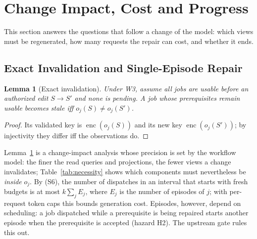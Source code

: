 \documentclass[pdflatex,sn-mathphys-num]{sn-jnl}
\theoremstyle{thmstyleone}%
\newtheorem{lemma}[theorem]{Lemma}%
\theoremstyle{thmstyletwo}%
\theoremstyle{thmstylethree}%
\newcommand{\enc}{\operatorname{enc}}
\begin{document}
\section{Change Impact, Cost and Progress}\label{sec:progress}
This section answers the questions that follow a change of the model: which views must be regenerated, how many requests the repair can cost, and whether it ends.

\subsection{Exact Invalidation and Single-Episode Repair}
\begin{lemma}[Exact invalidation]\label{lem:local}
Under W3, assume all jobs are usable before an authorized edit $S\to S'$ and none is pending. A job whose prerequisites remain usable becomes stale iff $o_j(S)\ne o_j(S')$.
\end{lemma}
\begin{proof}
Its validated key is $\enc(o_j(S))$ and its new key $\enc(o_j(S'))$; by injectivity they differ iff the observations do.
\end{proof}
Lemma~\ref{lem:local} is a change-impact analysis whose precision is set by the workflow model: the finer the read queries and projections, the fewer views a change invalidates; Table~\ref{tab:necessity} shows which components must nevertheless be \emph{inside} $o_j$. By (S6), the number of dispatches in an interval that starts with fresh budgets is at most $k\sum_jE_j$, where $E_j$ is the number of episodes of $j$; with per-request token caps this bounds generation cost. Episodes, however, depend on scheduling: a job dispatched while a prerequisite is being repaired starts another episode when the prerequisite is accepted (hazard H2). The upstream gate rules this out.
\end{document}

